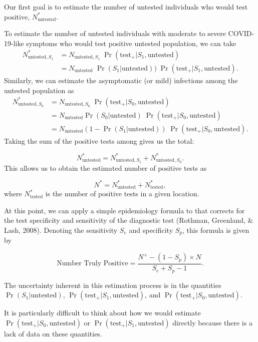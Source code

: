 \documentclass[12pt,twoside]{smiththesis}
\begin{document}
Our first goal is to estimate the number of untested individuals who would test positive, \(N^*_{\text{untested}}\).

To estimate the number of untested individuals with moderate to severe COVID-19-like symptoms who would test positive untested population, we can take
\begin{align*}
N^*_{\text{untested},S_1} &=N_{\text{untested},S_1} \; \Pr(\text{test}_+ | S_1,\text{untested})\\
&=N_{\text{untested}} \; \Pr(S_1|\text{untested})) \; \Pr(\text{test}_+ | S_1,\text{untested}).
\end{align*}
Similarly, we can estimate the asymptomatic (or mild) infections among the untested population as
\begin{align*}
N^*_{\text{untested},S_0} &=N_{\text{untested},S_0} \; \Pr(\text{test}_+ | S_0,\text{untested})\\
&=N_{\text{untested}} \Pr(S_0|\text{untested}) \; \Pr(\text{test}_+ | S_0,\text{untested})\\
&=N_{\text{untested}}(1-\Pr(S_1|\text{untested})) \; \Pr(\text{test}_+ | S_0,\text{untested}).
\end{align*}
Taking the sum of the positive tests among gives us the total:

\[N^*_{\text{untested}} = N^*_{\text{untested},S_1} + N^*_{\text{untested},S_0}.\]
This allows us to obtain the estimated number of positive tests as

\[N^* = N^*_{\text{untested}} +N^*_{\text{tested}},\]
where \(N^*_{\text{tested}}\) is the number of positive tests in a given location.

At this point, we can apply a simple epidemiology formula to that corrects for the test specificity and sensitivity of the diagnostic test (Rothman, Greenland, \& Lash, 2008). Denoting the sensitivity \(S_e\) and specificity \(S_p\), this formula is given by

\[\text{Number Truly Positive} = \dfrac{N^+ - (1-S_p) \times N}{S_e+S_p-1}.\]

The uncertainty inherent in this estimation process is in the quantities \(\Pr(S_1|\text{untested})\), \(\Pr(\text{test}_+| S_1,\text{untested})\), and \(\Pr(\text{test}_+ | S_0,\text{untested})\).

It is particularly difficult to think about how we would estimate \(\Pr(\text{test}_+ | S_0,\text{untested})\) or \(\Pr(\text{test}_+ | S_1,\text{untested})\) directly because there is a lack of data on these quantities.
\end{document}
